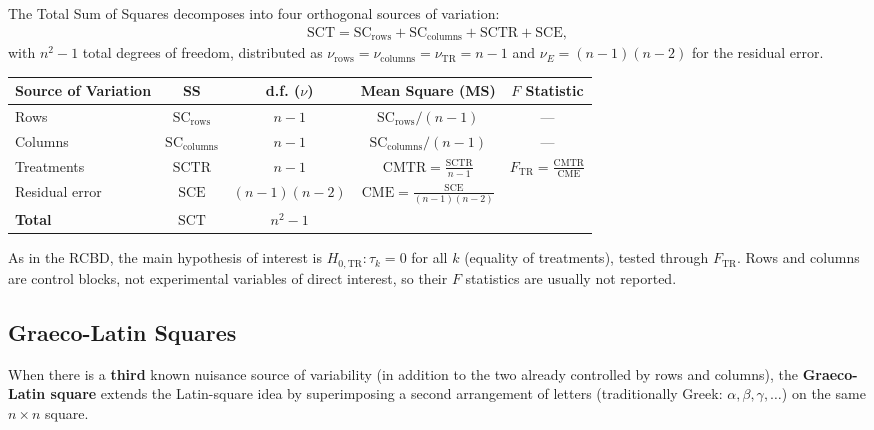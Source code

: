 \begin{teorema}
	The Total Sum of Squares decomposes into four orthogonal sources of variation:
	\begin{align}
		\text{SCT} = \text{SC}_{\text{rows}} + \text{SC}_{\text{columns}} + \text{SCTR} + \text{SCE},
	\end{align}
	with $n^2 - 1$ total degrees of freedom, distributed as $\nu_{\text{rows}} = \nu_{\text{columns}} = \nu_{\text{TR}} = n-1$ and $\nu_E = (n-1)(n-2)$ for the residual error.
\end{teorema}

\begin{center}
	\begin{tabular}{lcccc}
		\hline
		\textbf{Source of Variation} & \textbf{SS} & \textbf{d.f. ($\nu$)} & \textbf{Mean Square (MS)} & \textbf{$F$ Statistic} \\ \hline
		Rows & $\text{SC}_{\text{rows}}$ & $n-1$ & $\text{SC}_{\text{rows}}/(n-1)$ & --- \\ [1ex]
		Columns & $\text{SC}_{\text{columns}}$ & $n-1$ & $\text{SC}_{\text{columns}}/(n-1)$ & --- \\ [1ex]
		Treatments & $\text{SCTR}$ & $n-1$ & $\text{CMTR} = \frac{\text{SCTR}}{n-1}$ & $F_{\text{TR}} = \frac{\text{CMTR}}{\text{CME}}$ \\ [1ex]
		Residual error & $\text{SCE}$ & $(n-1)(n-2)$ & $\text{CME} = \frac{\text{SCE}}{(n-1)(n-2)}$ & \\ [1ex] \hline
		\textbf{Total} & $\text{SCT}$ & $n^2 - 1$ & & \\ \hline
	\end{tabular}
\end{center}

\begin{observacion}
	As in the RCBD, the main hypothesis of interest is $H_{0,\text{TR}}: \tau_k = 0$ for all $k$ (equality of treatments), tested through $F_{\text{TR}}$. Rows and columns are control blocks, not experimental variables of direct interest, so their $F$ statistics are usually not reported.
\end{observacion}

\subsection{Graeco-Latin Squares}

When there is a \textbf{third} known nuisance source of variability (in addition to the two already controlled by rows and columns), the \textbf{Graeco-Latin square} extends the Latin-square idea by superimposing a second arrangement of letters (traditionally Greek: $\alpha, \beta, \gamma, \ldots$) on the same $n \times n$ square.

